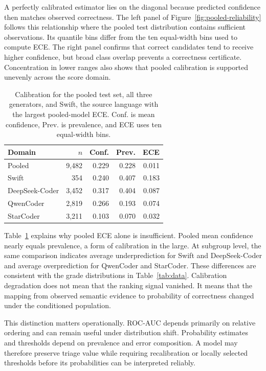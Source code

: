 \documentclass[conference]{IEEEtran}
\begin{document}
A perfectly calibrated estimator lies on the diagonal because predicted confidence then matches observed correctness. The left panel of Figure~\ref{fig:pooled-reliability} follows this relationship where the pooled test distribution contains sufficient observations. Its quantile bins differ from the ten equal-width bins used to compute ECE. The right panel confirms that correct candidates tend to receive higher confidence, but broad class overlap prevents a correctness certificate. Concentration in lower ranges also shows that pooled calibration is supported unevenly across the score domain.

\begin{table}[t]
\centering
\caption{Calibration for the pooled test set, all three generators, and Swift, the source language with the largest pooled-model ECE. Conf. is mean confidence, Prev. is prevalence, and ECE uses ten equal-width bins.}
\label{tab:calibration}
\begin{tabular}{@{}lrrrr@{}}
\toprule
Domain & $n$ & Conf. & Prev. & ECE \\
\midrule
Pooled & 9,482 & 0.229 & 0.228 & 0.011 \\
Swift & 354 & 0.240 & 0.407 & 0.183 \\
DeepSeek-Coder & 3,452 & 0.317 & 0.404 & 0.087 \\
QwenCoder & 2,819 & 0.266 & 0.193 & 0.074 \\
StarCoder & 3,211 & 0.103 & 0.070 & 0.032 \\
\bottomrule
\end{tabular}
\end{table}

Table~\ref{tab:calibration} explains why pooled ECE alone is insufficient. Pooled mean confidence nearly equals prevalence, a form of calibration in the large. At subgroup level, the same comparison indicates average underprediction for Swift and DeepSeek-Coder and average overprediction for QwenCoder and StarCoder. These differences are consistent with the grade distributions in Table~\ref{tab:data}. Calibration degradation does not mean that the ranking signal vanished. It means that the mapping from observed semantic evidence to probability of correctness changed under the conditioned population.

This distinction matters operationally. ROC-AUC depends primarily on relative ordering and can remain useful under distribution shift. Probability estimates and thresholds depend on prevalence and error composition. A model may therefore preserve triage value while requiring recalibration or locally selected thresholds before its probabilities can be interpreted reliably.
\end{document}
